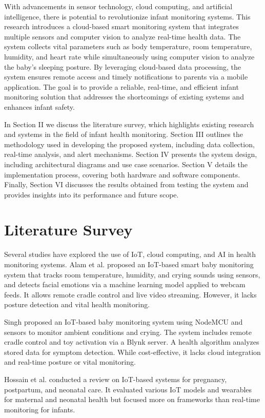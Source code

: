 \documentclass[conference]{IEEEtran}
\begin{document}
    With advancements in sensor technology, cloud computing, and artificial intelligence, there is potential to revolutionize infant monitoring systems. This research introduces a cloud-based smart monitoring system that integrates multiple sensors and computer vision to analyze real-time health data. The system collects vital parameters such as body temperature, room temperature, humidity, and heart rate while simultaneously using computer vision to analyze the baby’s sleeping posture. By leveraging cloud-based data processing, the system ensures remote access and timely notifications to parents via a mobile application. The goal is to provide a reliable, real-time, and efficient infant monitoring solution that addresses the shortcomings of existing systems and enhances infant safety.

    In Section II we discuss the literature survey, which highlights existing research and systems in the field of infant health monitoring. Section III outlines the methodology used in developing the proposed system, including data collection, real-time analysis, and alert mechanisms. Section IV presents the system design, including architectural diagrams and use case scenarios. Section V details the implementation process, covering both hardware and software components. Finally, Section VI discusses the results obtained from testing the system and provides insights into its performance and future scope.
\section{Literature Survey}
Several studies have explored the use of IoT, cloud computing, and AI in health monitoring systems. Alam et al. proposed an IoT-based smart baby monitoring system that tracks room temperature, humidity, and crying sounds using sensors, and detects facial emotions via a machine learning model applied to webcam feeds. It allows remote cradle control and live video streaming. However, it lacks posture detection and vital health monitoring\cite{ref1}.

Singh proposed an IoT-based baby monitoring system using NodeMCU and sensors to monitor ambient conditions and crying. The system includes remote cradle control and toy activation via a Blynk server. A health algorithm analyzes stored data for symptom detection. While cost-effective, it lacks cloud integration and real-time posture or vital monitoring\cite{ref2}.

Hossain et al. conducted a review on IoT-based systems for pregnancy, postpartum, and neonatal care. It evaluated various IoT models and wearables for maternal and neonatal health but focused more on frameworks than real-time monitoring for infants\cite{ref3}.
\end{document}
